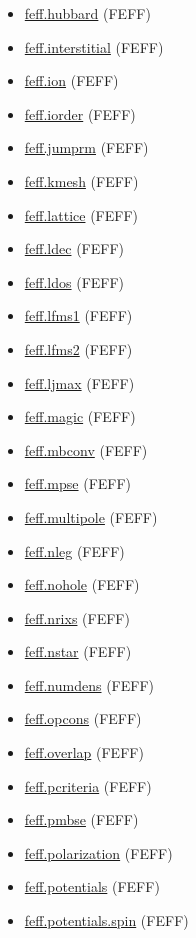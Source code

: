 \documentclass[11pt]{article}
\begin{document}
\begin{itemize}
\item \hyperref[kw:feff-hubbard]{feff.hubbard} (FEFF)
\item \hyperref[kw:feff-interstitial]{feff.interstitial} (FEFF)
\item \hyperref[kw:feff-ion]{feff.ion} (FEFF)
\item \hyperref[kw:feff-iorder]{feff.iorder} (FEFF)
\item \hyperref[kw:feff-jumprm]{feff.jumprm} (FEFF)
\item \hyperref[kw:feff-kmesh]{feff.kmesh} (FEFF)
\item \hyperref[kw:feff-lattice]{feff.lattice} (FEFF)
\item \hyperref[kw:feff-ldec]{feff.ldec} (FEFF)
\item \hyperref[kw:feff-ldos]{feff.ldos} (FEFF)
\item \hyperref[kw:feff-lfms1]{feff.lfms1} (FEFF)
\item \hyperref[kw:feff-lfms2]{feff.lfms2} (FEFF)
\item \hyperref[kw:feff-ljmax]{feff.ljmax} (FEFF)
\item \hyperref[kw:feff-magic]{feff.magic} (FEFF)
\item \hyperref[kw:feff-mbconv]{feff.mbconv} (FEFF)
\item \hyperref[kw:feff-mpse]{feff.mpse} (FEFF)
\item \hyperref[kw:feff-multipole]{feff.multipole} (FEFF)
\item \hyperref[kw:feff-nleg]{feff.nleg} (FEFF)
\item \hyperref[kw:feff-nohole]{feff.nohole} (FEFF)
\item \hyperref[kw:feff-nrixs]{feff.nrixs} (FEFF)
\item \hyperref[kw:feff-nstar]{feff.nstar} (FEFF)
\item \hyperref[kw:feff-numdens]{feff.numdens} (FEFF)
\item \hyperref[kw:feff-opcons]{feff.opcons} (FEFF)
\item \hyperref[kw:feff-overlap]{feff.overlap} (FEFF)
\item \hyperref[kw:feff-pcriteria]{feff.pcriteria} (FEFF)
\item \hyperref[kw:feff-pmbse]{feff.pmbse} (FEFF)
\item \hyperref[kw:feff-polarization]{feff.polarization} (FEFF)
\item \hyperref[kw:feff-potentials]{feff.potentials} (FEFF)
\item \hyperref[kw:feff-potentials-spin]{feff.potentials.spin} (FEFF)

\end{itemize}
\end{document}
